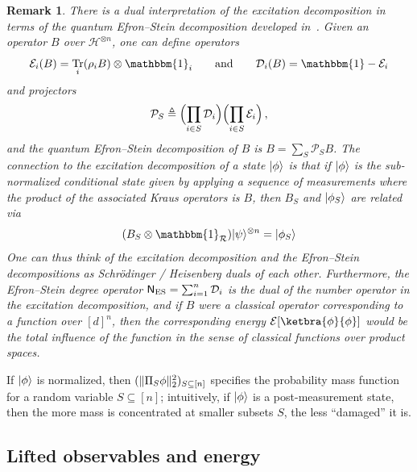 \documentclass[10pt]{article}
\DeclarePairedDelimiter{\ket}{\lvert}{\rangle}%
\DeclarePairedDelimiter\norm{\lVert}{\rVert}
\newcommand{\energy}{\mathcal{E}}
\DeclareMathOperator{\Tr}{Tr}
\newcommand{\Id}{\mathbbm{1}}
\newtheorem{remark}[theorem]{Remark}
\begin{document}
\begin{remark}\label{remark:efronstein}
    There is a dual interpretation of the excitation decomposition in terms of the \emph{quantum Efron--Stein decomposition} developed in~\cite{de2025non}. Given an operator $B$ over $\mathcal{H}^{\otimes n}$, one can define operators 
    \begin{equation}
        \mathcal{E}_i(B) = \Tr_i(\rho_i B)\otimes \Id_i \qquad \text{and} \qquad \mathcal{D}_i(B) = \Id - \mathcal{E}_i
    \end{equation} and projectors
    \begin{equation}
        \mathcal{P}_S \triangleq \Bigl(\prod_{i\in S} \mathcal{D}_i\Bigr)\Bigl(\prod_{i\in S}\mathcal{E}_i\Bigr)\,,
    \end{equation}
    and the \emph{quantum Efron--Stein decomposition} of $B$ is $B = \sum_S \mathcal{P}_S B$. The connection to the excitation decomposition of a state $\ket{\phi}$ is that if $\ket{\phi}$ is the sub-normalized conditional state given by applying a sequence of measurements where the product of the associated Kraus operators is $B$, then $B_S$ and $\ket{\phi_S}$ are related via
    \begin{equation}
        (B_S \otimes \Id_{\mathcal{R}})\ket{\psi}^{\otimes n} = \ket{\phi_S}
    \end{equation}
    One can thus think of the excitation decomposition and the Efron--Stein decompositions as Schr\"odinger / Heisenberg duals of each other. Furthermore, the \emph{Efron--Stein degree operator} $\mathsf{N}_{\rm ES} = \sum^n_{i=1} \mathcal{D}_i$ is the dual of the number operator in the excitation decomposition, and if $B$ were a classical operator corresponding to a function over $[d]^n$, then the corresponding energy $\energy[\ketbra{\phi}{\phi}]$ would be the \emph{total influence} of the function in the sense of classical functions over product spaces.
\end{remark}

\noindent If $\ket{\phi}$ is normalized, then $(\norm{\Pi_S\phi}^2_2)_{S\subseteq[n]}$ specifies the probability mass function for a random variable $S\subseteq[n]$; intuitively, if $\ket{\phi}$ is a post-measurement state, then the more mass is concentrated at smaller subsets $S$, the less ``damaged'' it is. 

\subsection{Lifted observables and energy}
\label{sec:lifted}
\end{document}
